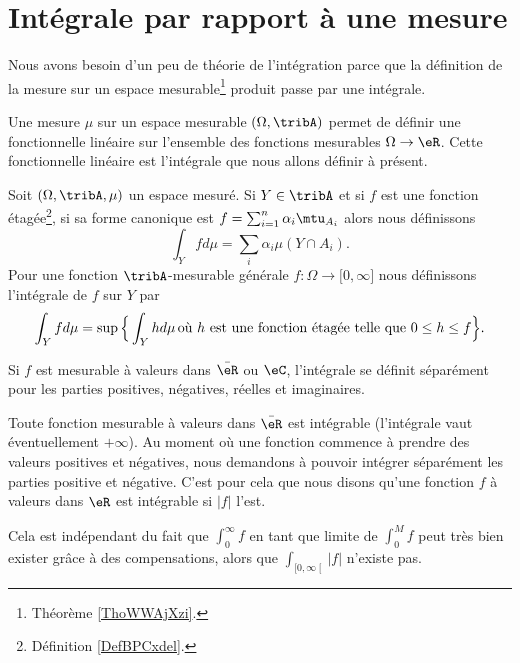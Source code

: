 \section{Intégrale par rapport à une mesure}

Nous avons besoin d'un peu de théorie de l'intégration parce que la définition de la mesure sur un espace mesurable\footnote{Théorème \ref{ThoWWAjXzi}.} produit passe par une intégrale.

Une mesure \( \mu\) sur un espace mesurable \( (\Omega,\tribA)\) permet de définir une fonctionnelle linéaire sur l'ensemble des fonctions mesurables \( \Omega\to \eR\). Cette fonctionnelle linéaire est l'intégrale que nous allons définir à présent.

\begin{definition}  \label{DefTVOooleEst}
    Soit \( (\Omega,\tribA,\mu)\) un espace mesuré. Si \( Y\in \tribA\) et si \( f\) est une fonction étagée\footnote{Définition \ref{DefBPCxdel}.}, si sa forme canonique est \( f=\sum_{i=1}^n\alpha_i\mtu_{A_i}\) alors nous définissons
    \begin{equation}
        \int_Yfd\mu=\sum_i\alpha_i\mu(Y\cap A_i).
    \end{equation}
    Pour une fonction \( \tribA\)-mesurable générale \( f\colon \Omega\to \mathopen[ 0 , \infty \mathclose]\) nous définissons l'intégrale de \( f\) sur \( Y\) par
    \begin{equation}        \label{EqDefintYfdmu}
        \int_Yfd\mu=\sup\Big\{ \int_Yhd\mu\,\text{où \( h\) est une fonction étagée telle que \( 0\leq h\leq f\)} \Big\}.
    \end{equation}

    Si $f$ est mesurable à valeurs dans \( \bar \eR\) ou \( \eC\), l'intégrale se définit séparément pour les parties positives, négatives, réelles et imaginaires.
\end{definition}

\begin{remark}
    Toute fonction mesurable à valeurs dans \( \bar \eR\) est intégrable (l'intégrale vaut éventuellement \( +\infty\)). Au moment où une fonction commence à prendre des valeurs positives et négatives, nous demandons à pouvoir intégrer séparément les parties positive et négative. C'est pour cela que nous disons qu'une fonction \( f\) à valeurs dans \( \eR\) est intégrable si \( | f |\) l'est.

    Cela est indépendant du fait que \( \int_0^{\infty}f\) en tant que limite de \( \int_0^{M}f\) peut très bien exister grâce à des compensations, alors que \( \int_{\mathopen[ 0 , \infty \mathclose[}| f |\) n'existe pas.
\end{remark}

